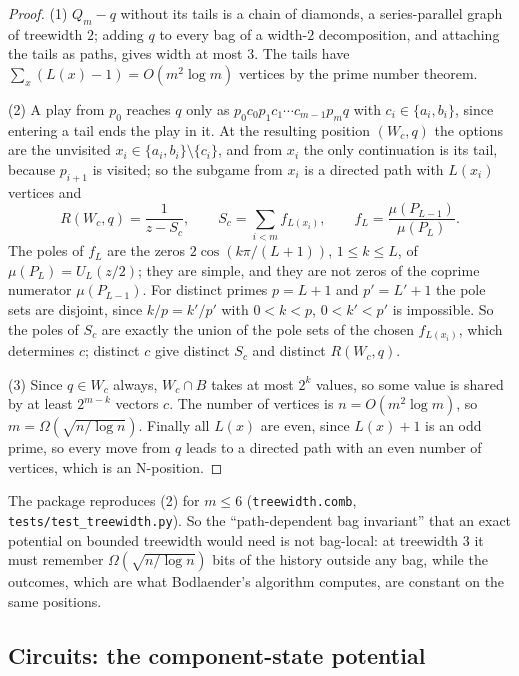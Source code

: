 \documentclass[final]{siamart0516}
\numberwithin{theorem}{section}
\numberwithin{equation}{section}
\theoremstyle{siamnonum}
\theoremstyle{plain}
\newcommand{\code}[1]{{\ttfamily\nolinkurl{#1}}}
\begin{document}
\begin{proof}
(1) $Q_m-q$ without its tails is a chain of diamonds, a series-parallel graph of treewidth $2$; adding $q$ to every bag of a width-$2$ decomposition, and attaching the tails as paths, gives width at most $3$. The tails have $\sum_x(L(x)-1)=O(m^{2}\log m)$ vertices by the prime number theorem.

(2) A play from $p_0$ reaches $q$ only as $p_0c_0p_1c_1\cdots c_{m-1}p_mq$ with $c_i\in\{a_i,b_i\}$, since entering a tail ends the play in it. At the resulting position $(W_c,q)$ the options are the unvisited $x_i\in\{a_i,b_i\}\setminus\{c_i\}$, and from $x_i$ the only continuation is its tail, because $p_{i+1}$ is visited; so the subgame from $x_i$ is a directed path with $L(x_i)$ vertices and
\[
R(W_c,q)=\frac{1}{z-S_c},\qquad S_c=\sum_{i<m}f_{L(x_i)},\qquad f_L=\frac{\mu(P_{L-1})}{\mu(P_L)}.
\]
The poles of $f_L$ are the zeros $2\cos(k\pi/(L+1))$, $1\le k\le L$, of $\mu(P_L)=U_L(z/2)$; they are simple, and they are not zeros of the coprime numerator $\mu(P_{L-1})$. For distinct primes $p=L+1$ and $p'=L'+1$ the pole sets are disjoint, since $k/p=k'/p'$ with $0<k<p$, $0<k'<p'$ is impossible. So the poles of $S_c$ are exactly the union of the pole sets of the chosen $f_{L(x_i)}$, which determines $c$; distinct $c$ give distinct $S_c$ and distinct $R(W_c,q)$.

(3) Since $q\in W_c$ always, $W_c\cap B$ takes at most $2^{k}$ values, so some value is shared by at least $2^{m-k}$ vectors $c$. The number of vertices is $n=O(m^{2}\log m)$, so $m=\Omega(\sqrt{n/\log n})$. Finally all $L(x)$ are even, since $L(x)+1$ is an odd prime, so every move from $q$ leads to a directed path with an even number of vertices, which is an N-position.
\end{proof}

The package reproduces (2) for $m\le6$ (\code{treewidth.comb}, \code{tests/test_treewidth.py}). So the ``path-dependent bag invariant'' that an exact potential on bounded treewidth would need is not bag-local: at treewidth $3$ it must remember $\Omega(\sqrt{n/\log n})$ bits of the history outside any bag, while the outcomes, which are what Bodlaender's algorithm computes, are constant on the same positions.

\subsection{Circuits: the component-state potential}\label{ssec:circuits}
\end{document}
